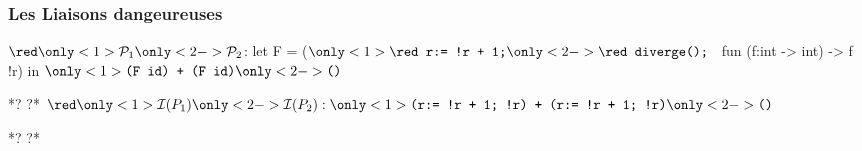\begin{frame}[fragile]\frametitle{Les Liaisons dangeureuses}
\begin{small}

\begin{whycode} 
${\red \only<1>{\mathcal{P}_1}\only<2->{\mathcal{P}_2}}$: 
   let F = 
      ($\only<1>{\texttt{\red r:= !r + 1;}}\only<2->{\texttt{\red diverge(); }}$ fun (f:int -> int) -> f !r)
   in $\only<1>{\texttt{(F id) + (F id)}}\only<2->{\texttt{()}}$
   
*?%
?* 
${\red\only<1>{ \mathcal{I}(P_1)}\only<2->{\mathcal{I}(P_2)}}: \only<1>{\texttt{(r:= !r + 1; !r) + (r:= !r + 1; !r)}}
\only<2->{\texttt{()}}$
   
*?%
?*
\end{whycode}
\end{small}
\end{frame}


